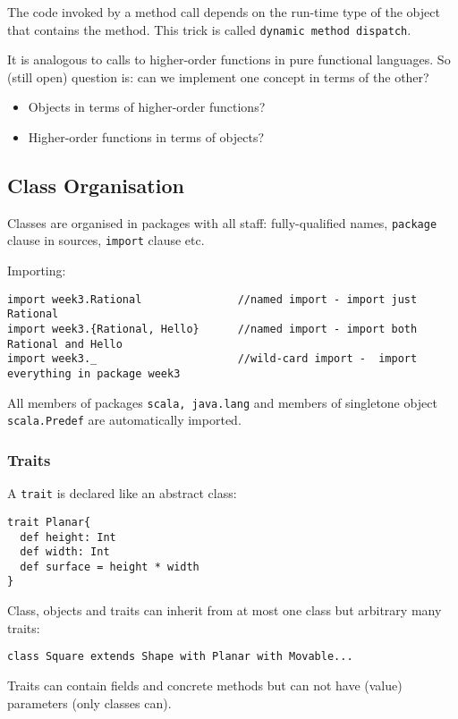 \documentclass{scrartcl}
\newcommand{\term}[1]{\verb~#1~} %
\begin{document}
The code invoked by a method call depends on the run-time type of the object
that contains the method. This trick is called \term{dynamic method dispatch}.

It is analogous to calls to higher-order functions in pure functional languages.
So (still open) question is: can we implement one concept in terms of the other?
\begin{itemize}
\item Objects in terms of higher-order functions?
\item Higher-order functions in terms of objects?
\end{itemize}


\subsection{Class Organisation}
\label{sec:ClassOrganisation}

Classes are organised in packages with all staff: fully-qualified names,
\lstinline|package| clause in sources, \lstinline|import| clause etc.

Importing:
\begin{lstlisting}
import week3.Rational               //named import - import just Rational
import week3.{Rational, Hello}      //named import - import both Rational and Hello
import week3._                      //wild-card import -  import everything in package week3
\end{lstlisting}
All members of packages \lstinline|scala, java.lang| and members of singletone
object \lstinline|scala.Predef| are automatically imported.

\subsubsection{Traits}
\label{sec:Traits}

A \term{trait} is declared like an abstract class:
\begin{lstlisting}
trait Planar{
  def height: Int
  def width: Int
  def surface = height * width
}
\end{lstlisting}

Class, objects and traits can inherit from at most one class but arbitrary many
traits:
\begin{lstlisting}
class Square extends Shape with Planar with Movable...
\end{lstlisting}

Traits can contain fields and concrete methods but can not have (value)
parameters (only classes can).
\end{document}
